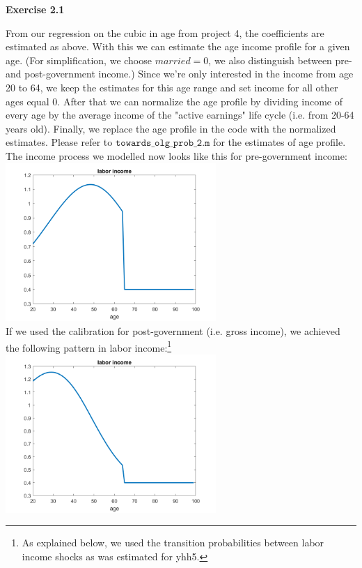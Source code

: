 \documentclass[12pt,a4paper]{article}
\begin{document}
\textbf{Exercise 2.1}

From our regression on the cubic in age from project 4, the coefficients are estimated as above. With this we can estimate the age income profile for a given age. (For simplification, we choose $married=0$, we also distinguish between pre-and post-government income.) Since we're only interested in the income from age 20 to 64, we keep the estimates for this age range and set income for all other ages equal 0. After that we can normalize the age profile by dividing income of every age by the average income of the "active earnings" life cycle (i.e. from 20-64 years old). Finally, we replace the age profile in the code with the normalized estimates. Please refer to $\texttt{towards\_olg\_prob\_2.m}$ for the estimates of age profile. \\

The income process we modelled now looks like this for pre-government income: \\
\includegraphics[width=0.6\textwidth]{PS5/Graphs/labor income.png}
\\
If we used the calibration for post-government (i.e. gross income), we achieved the following pattern in labor income:\footnote{As explained below, we used the transition probabilities between labor income shocks as was estimated for yhh5.}\\
\includegraphics[width=0.6\textwidth]{PS5/Graphs/labor income post gov.png}\\
\end{document}
